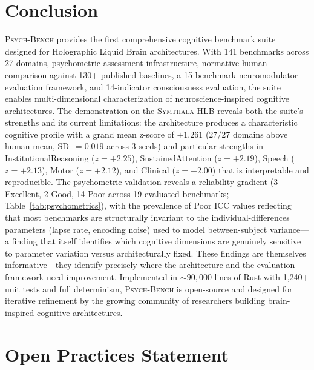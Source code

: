\documentclass[11pt,letterpaper]{article}
\newcommand{\symthaea}{\textsc{Symthaea}}
\newcommand{\psychbench}{\textsc{Psych-Bench}}
\newcommand{\hlb}{\textsc{HLB}}
\begin{document}
\section{Conclusion}
\label{sec:conclusion}

\psychbench{} provides the first comprehensive cognitive benchmark suite designed for Holographic Liquid Brain architectures. With 141 benchmarks across 27 domains, psychometric assessment infrastructure, normative human comparison against 130+ published baselines, a 15-benchmark neuromodulator evaluation framework, and 14-indicator consciousness evaluation, the suite enables multi-dimensional characterization of neuroscience-inspired cognitive architectures. The demonstration on the \symthaea{} \hlb{} reveals both the suite's strengths and its current limitations: the architecture produces a characteristic cognitive profile with a grand mean z-score of $+1.261$ (27/27 domains above human mean, SD~$= 0.019$ across 3 seeds) and particular strengths in InstitutionalReasoning ($z = +2.25$), SustainedAttention ($z = +2.19$), Speech ($z = +2.13$), Motor ($z = +2.12$), and Clinical ($z = +2.00$) that is interpretable and reproducible. The psychometric validation reveals a reliability gradient (3 Excellent, 2 Good, 14 Poor across 19 evaluated benchmarks; Table~\ref{tab:psychometrics}), with the prevalence of Poor ICC values reflecting that most benchmarks are structurally invariant to the individual-differences parameters (lapse rate, encoding noise) used to model between-subject variance---a finding that itself identifies which cognitive dimensions are genuinely sensitive to parameter variation versus architecturally fixed. These findings are themselves informative---they identify precisely where the architecture and the evaluation framework need improvement. Implemented in ${\sim}90{,}000$ lines of Rust with 1,240+ unit tests and full determinism, \psychbench{} is open-source and designed for iterative refinement by the growing community of researchers building brain-inspired cognitive architectures.

\section*{Open Practices Statement}
\end{document}
